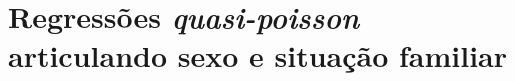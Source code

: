 %

\clearpage
\section{Regressões \textit{quasi-poisson} articulando sexo e situação familiar}\label{sec:analises-reg-pisson}

